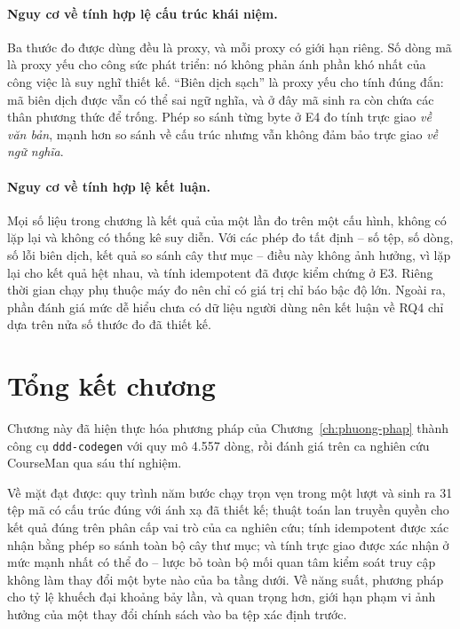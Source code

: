 \paragraph{Nguy cơ về tính hợp lệ cấu trúc khái niệm.}
Ba thước đo được dùng đều là proxy, và mỗi proxy có giới hạn riêng. Số dòng mã là proxy yếu cho công sức phát triển: nó không phản ánh phần khó nhất của công việc là suy nghĩ thiết kế. ``Biên dịch sạch'' là proxy yếu cho tính đúng đắn: mã biên dịch được vẫn có thể sai ngữ nghĩa, và ở đây mã sinh ra còn chứa các thân phương thức để trống. Phép so sánh từng byte ở E4 đo tính trực giao \emph{về văn bản}, mạnh hơn so sánh về cấu trúc nhưng vẫn không đảm bảo trực giao \emph{về ngữ nghĩa}.

\paragraph{Nguy cơ về tính hợp lệ kết luận.}
Mọi số liệu trong chương là kết quả của một lần đo trên một cấu hình, không có lặp lại và không có thống kê suy diễn. Với các phép đo tất định -- số tệp, số dòng, số lỗi biên dịch, kết quả so sánh cây thư mục -- điều này không ảnh hưởng, vì lặp lại cho kết quả hệt nhau, và tính idempotent đã được kiểm chứng ở E3. Riêng thời gian chạy phụ thuộc máy đo nên chỉ có giá trị chỉ báo bậc độ lớn. Ngoài ra, phần đánh giá mức dễ hiểu chưa có dữ liệu người dùng nên kết luận về RQ4 chỉ dựa trên nửa số thước đo đã thiết kế.

\section{Tổng kết chương}
\label{sec:tong-ket-c4}

Chương này đã hiện thực hóa phương pháp của Chương~\ref{ch:phuong-phap} thành công cụ \texttt{ddd-codegen} với quy mô 4.557 dòng, rồi đánh giá trên ca nghiên cứu CourseMan qua sáu thí nghiệm.

Về mặt đạt được: quy trình năm bước chạy trọn vẹn trong một lượt và sinh ra 31 tệp mã có cấu trúc đúng với ánh xạ đã thiết kế; thuật toán lan truyền quyền cho kết quả đúng trên phân cấp vai trò của ca nghiên cứu; tính idempotent được xác nhận bằng phép so sánh toàn bộ cây thư mục; và tính trực giao được xác nhận ở mức mạnh nhất có thể đo -- lược bỏ toàn bộ mối quan tâm kiểm soát truy cập không làm thay đổi một byte nào của ba tầng dưới. Về năng suất, phương pháp cho tỷ lệ khuếch đại khoảng bảy lần, và quan trọng hơn, giới hạn phạm vi ảnh hưởng của một thay đổi chính sách vào ba tệp xác định trước.

